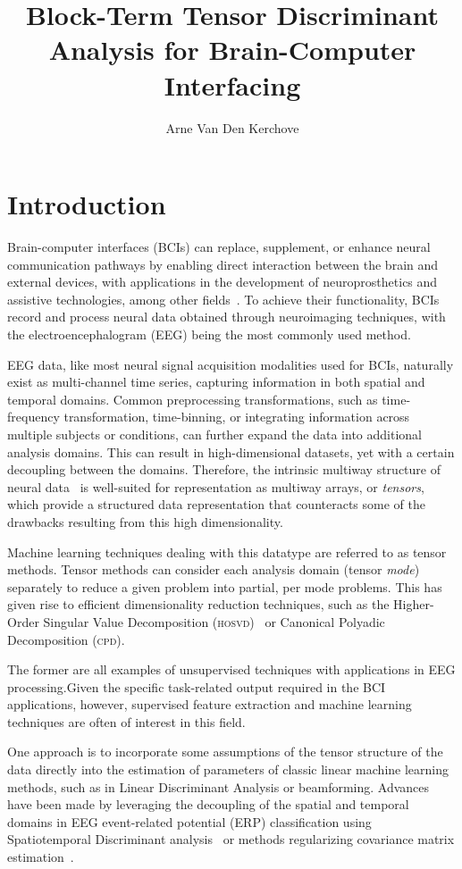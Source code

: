 \documentclass[twocolumn]{article}
\title{Block-Term Tensor Discriminant Analysis for Brain-Computer Interfacing}
\author{Arne Van Den Kerchove}
\begin{document}
\maketitle

\section{Introduction}
Brain-computer interfaces (BCIs) can replace, supplement, or enhance neural
communication pathways by enabling direct interaction between the brain and
external devices, with applications in the development of neuroprosthetics and
assistive technologies, among other fields~\cite{NicolasAlonso2012}.
To achieve their functionality, BCIs record and process neural data obtained
through neuroimaging techniques, with the electroencephalogram (EEG) being the
most commonly used method.

EEG data, like most neural signal acquisition modalities used for BCIs,
naturally exist as multi-channel time series, capturing information in both
spatial and temporal domains.
Common preprocessing transformations, such as time-frequency transformation,
time-binning, or integrating information across multiple subjects or conditions,
can further expand the data into additional analysis domains.
This can result in high-dimensional datasets, yet with a certain decoupling
between the domains.
Therefore, the intrinsic multiway structure of neural data~\cite{Erol2022} is
well-suited for representation as multiway arrays, or \emph{tensors}, which
provide a structured data representation that counteracts some of the drawbacks
resulting from this high dimensionality.

Machine learning techniques dealing with this datatype are referred to as tensor
methods.
Tensor methods can consider each analysis domain (tensor \emph{mode}) separately to
reduce a given problem into partial, per mode problems.
This has given rise to efficient dimensionality reduction techniques, such as
the Higher-Order Singular Value Decomposition
(\textsc{hosvd})~\cite{DeLathauwer2000,SoleCasals2018} or Canonical Polyadic Decomposition
(\textsc{cpd})\cite{Hitchcock1927,Nazarpour2006}.

The former are all examples of unsupervised techniques with applications in EEG
processing.Given the specific task-related output required in the BCI applications, however,
supervised feature extraction and machine learning techniques are often of
interest in this field.

One approach is to incorporate some assumptions of the tensor structure of the
data directly into the estimation of parameters of classic linear machine
learning methods, such as in Linear Discriminant Analysis or beamforming.
Advances have been made by leveraging the decoupling of the spatial and temporal
domains in EEG event-related potential (ERP) classification using Spatiotemporal
Discriminant analysis~\cite{Li2010,Zhang2013} or methods regularizing covariance
matrix estimation~\cite{Kerchove2022,Sosulski2022}.
\end{document}
